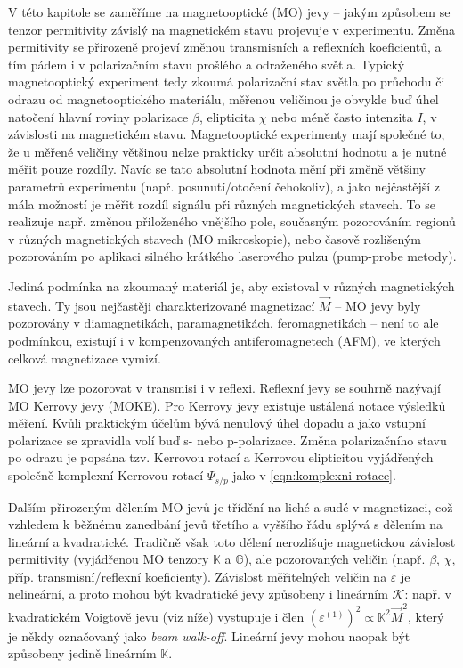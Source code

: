 V této kapitole se zaměříme na magnetooptické (MO) jevy -- jakým způsobem se tenzor permitivity závislý na magnetickém stavu projevuje v experimentu.
Změna permitivity se přirozeně projeví změnou transmisních a reflexních koeficientů, a tím pádem i v polarizačním stavu prošlého a odraženého světla.
Typický magnetooptický experiment tedy zkoumá polarizační stav světla po průchodu či odrazu od magnetooptického materiálu, měřenou veličinou je obvykle buď úhel natočení hlavní roviny polarizace $\beta$, elipticita $\chi$ nebo méně často intenzita $I$, v závislosti na magnetickém stavu.
Magnetooptické experimenty mají společné to, že u měřené veličiny většinou nelze prakticky určit absolutní hodnotu a je nutné měřit pouze rozdíly\cite{silberQuadraticMagnetoopticKerr2019a}.
Navíc se tato absolutní hodnota mění při změně většiny parametrů experimentu (např. posunutí/otočení čehokoliv), a jako nejčastější z mála možností je měřit rozdíl signálu při různých magnetických stavech.
To se realizuje např. změnou přiloženého vnějšího pole, současným pozorováním regionů v různých magnetických stavech (MO mikroskopie), nebo časově rozlišeným pozorováním po aplikaci silného krátkého laserového pulzu (pump-probe metody).

Jediná podmínka na zkoumaný materiál je, aby existoval v různých magnetických stavech.
Ty jsou nejčastěji charakterizované magnetizací $\vec{M}$ -- MO jevy byly pozorovány v diamagnetikách, paramagnetikách, feromagnetikách --
není to ale podmínkou, existují i v kompenzovaných antiferomagnetech (AFM)\cite{saidlOpticalDeterminationNeel2017}, ve kterých celková magnetizace vymizí.

MO jevy lze pozorovat v transmisi i v reflexi.
Reflexní jevy se souhrně nazývají MO Kerrovy jevy (MOKE).
Pro Kerrovy jevy existuje ustálená notace výsledků měření\cite{silberQuadraticMagnetoopticKerr2019a}.
Kvůli praktickým účelům bývá nenulový úhel dopadu a jako vstupní polarizace se zpravidla volí buď s- nebo p-polarizace. 
Změna polarizačního stavu po odrazu je popsána tzv. Kerrovou rotací a Kerrovou elipticitou vyjádřených společně komplexní Kerrovou rotací $\Psi_{s/p}$ jako v \eqref{eqn:komplexni-rotace}.

Dalším přirozeným dělením MO jevů je třídění na liché a sudé v magnetizaci, což vzhledem k běžnému zanedbání jevů třetího a vyššího řádu splývá s dělením na lineární a kvadratické.
Tradičně však toto dělení nerozlišuje magnetickou závislost permitivity (vyjádřenou MO tenzory $\mathbb{K}$ a $\mathbb{G}$), ale pozorovaných veličin (např. $\beta$, $\chi$, příp. transmisní/reflexní koeficienty). 
Závislost měřitelných veličin na $\varepsilon$ je nelineární, a proto mohou být kvadratické jevy způsobeny i lineárním $\mathcal{K}$: např. v kvadratickém Voigtově jevu (viz níže) vystupuje i člen $\left(\varepsilon^{(1)}\right)^2 \propto \mathbb{K}^2 \vec{M}^2$, který je někdy označovaný jako \emph{beam walk-off}\cite{akbarLowTemperatureVoigt2017}.
Lineární jevy mohou naopak být způsobeny jedině lineárním $\mathbb{K}$.

